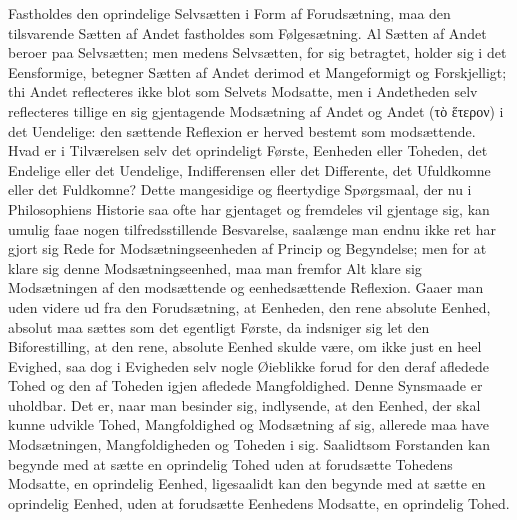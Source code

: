 \documentclass[12pt]{book}
\newcommand{\opage}[1]{\marginnote{\footnotesize\textit{[#1]}}}
\begin{document}
Fastholdes den oprindelige Selvsætten i Form af Forudsætning, maa den tilsvarende
Sætten af Andet fastholdes som Følgesætning. Al Sætten af Andet beroer paa
Selvsætten; men medens Selvsætten, for sig betragtet, holder sig i det Eensformige,
betegner Sætten af Andet derimod et Mangeformigt og Forskjelligt; thi Andet
reflecteres ikke blot som Selvets Modsatte, men i Andetheden selv reflecteres
tillige en sig gjentagende Modsætning af Andet og Andet (τὸ ἕτερον) i det
Uendelige: den sættende Reflexion er herved bestemt som modsættende. Hvad er i
Tilværelsen selv det oprindeligt Første, Eenheden eller Toheden, det Endelige eller
det Uendelige, Indifferensen eller det Differente, det Ufuldkomne eller det
Fuldkomne? Dette mangesidige og fleertydige Spørgsmaal, der nu i Philosophiens
Historie saa ofte har gjentaget og fremdeles vil gjentage sig, kan umulig faae
nogen tilfredsstillende Besvarelse, saalænge man endnu ikke ret har gjort sig Rede
for Modsætningseenheden af Princip og Begyndelse; men for at klare sig denne
Modsætningseenhed, maa man fremfor Alt klare sig Modsætningen af den modsættende og
eenhedsættende Reflexion.
\opage{67} Gaaer man uden videre ud fra den Forudsætning, at Eenheden, den rene absolute
Eenhed, absolut maa sættes som det egentligt Første, da indsniger sig let den
Biforestilling, at den rene, absolute Eenhed skulde være, om ikke just en heel
Evighed, saa dog i Evigheden selv nogle Øieblikke forud for den deraf afledede
Tohed og den af Toheden igjen afledede Mangfoldighed. Denne Synsmaade er uholdbar.
Det er, naar man besinder sig, indlysende, at den Eenhed, der skal kunne udvikle
Tohed, Mangfoldighed og Modsætning af sig, allerede maa have Modsætningen,
Mangfoldigheden og Toheden i sig. Saalidtsom Forstanden kan begynde med at sætte en
oprindelig Tohed uden at forudsætte Tohedens Modsatte, en oprindelig Eenhed,
ligesaalidt kan den begynde med at sætte en oprindelig Eenhed, uden at forudsætte
Eenhedens Modsatte, en oprindelig Tohed.
\end{document}
